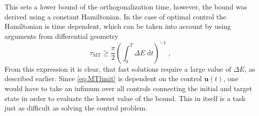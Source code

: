 This sets a lower bound of the orthogonalization time, however, the bound was derived using a constant Hamiltonian. In the case of optimal control the Hamiltonian is time dependent, which can be taken into account by using arguments from differential geometry \cite{Aharonov,beyondQSL}
\begin{equation}
	\tau_{\mathrm{MT}} \geq \frac{\pi}{2} \left( \int_{0}^{T} \Delta E \; \mathrm{d}t \right) ^{-1} \; , \label{eq:MTlimit}
\end{equation}
From this expression it is clear, that fast solutions require a large value of $\Delta E$, as described earlier. Since \ref{eq:MTlimit} is dependent on the control $\boldsymbol{u}(t)$, one would have to take an infimum over all controls connecting the initial and target state in order to evaluate the lowest value of the bound. This in itself is a task just as difficult as solving the control problem.


